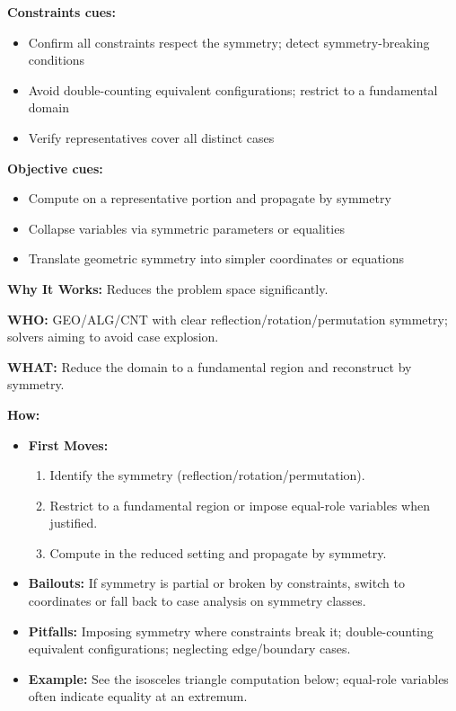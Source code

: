 \documentclass[12pt]{article}
\begin{document}
\textbf{Constraints cues:}
\begin{itemize}
    \item Confirm all constraints respect the symmetry; detect symmetry-breaking conditions
    \item Avoid double-counting equivalent configurations; restrict to a fundamental domain
    \item Verify representatives cover all distinct cases
\end{itemize}

\textbf{Objective cues:}
\begin{itemize}
    \item Compute on a representative portion and propagate by symmetry
    \item Collapse variables via symmetric parameters or equalities
    \item Translate geometric symmetry into simpler coordinates or equations
\end{itemize}

\textbf{Why It Works:} Reduces the problem space significantly.

\textbf{WHO:} GEO/ALG/CNT with clear reflection/rotation/permutation symmetry; solvers aiming to avoid case explosion.

\textbf{WHAT:} Reduce the domain to a fundamental region and reconstruct by symmetry.


\textbf{How:}
\begin{itemize}
    \item \textbf{First Moves:}
    \begin{enumerate}[nosep]
        \item Identify the symmetry (reflection/rotation/permutation).
        \item Restrict to a fundamental region or impose equal-role variables when justified.
        \item Compute in the reduced setting and propagate by symmetry.
    \end{enumerate}
    \item \textbf{Bailouts:} If symmetry is partial or broken by constraints, switch to coordinates or fall back to case analysis on symmetry classes.
    \item \textbf{Pitfalls:} Imposing symmetry where constraints break it; double-counting equivalent configurations; neglecting edge/boundary cases.
    \item \textbf{Example:} See the isosceles triangle computation below; equal-role variables often indicate equality at an extremum.
\end{itemize}
\end{document}
